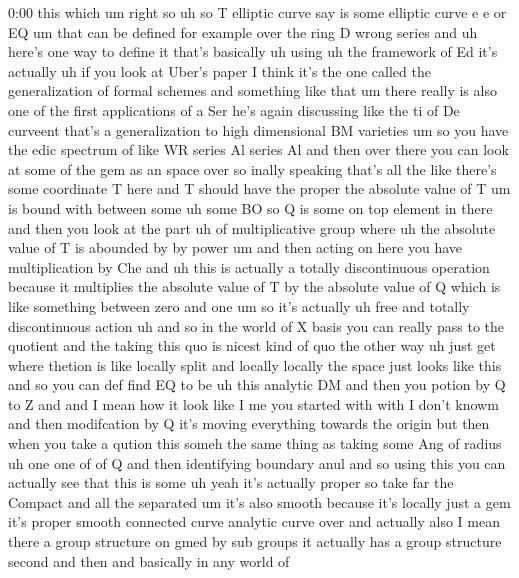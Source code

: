 \begin{unfinished}{0:00}
this
which
um  right  so
uh  so  T  elliptic  curve  say  is  some
elliptic  curve
e  e  or  EQ  um  that  can  be  defined  for
example  over  the  ring  D  wrong
series  and  uh  here's  one  way  to  define
it
that's  basically  uh  using  uh  the
framework  of
Ed  it's  actually  uh  if  you  look  at
Uber's  paper  I  think  it's  the  one  called
the  generalization  of  formal  schemes  and
something  like  that  um  there  really  is
also  one  of  the  first  applications  of  a
Ser  he's  again  discussing  like  the  ti  of
De  curveent  that's  a  generalization  to
high  dimensional  BM
varieties  um
so  you  have  the  edic  spectrum  of  like  WR
series
Al  series
Al  and
then  over  there  you  can  look  at  some  of
the  gem  as  an  space
over  so  inally  speaking  that's  all
the  like  there's  some  coordinate  T  here
and  T  should  have  the  proper  the
absolute  value  of  T
um  is  bound  with  between
some  uh  some
BO  so  Q  is  some  on  top  element  in  there
and  then  you  look  at  the  part  uh  of
multiplicative  group  where  uh  the
absolute  value  of  T  is  abounded
by  by  power  um  and  then  acting  on  here
you  have  multiplication  by
Che
and  uh  this  is  actually  a  totally
discontinuous  operation  because  it
multiplies  the  absolute  value  of  T  by
the  absolute  value  of  Q  which  is  like
something  between  zero  and  one  um  so
it's  actually  uh  free  and  totally
discontinuous  action  uh  and  so  in  the
world  of  X  basis  you  can  really  pass  to
the  quotient  and  the  taking  this  quo  is
nicest  kind  of  quo  the  other  way  uh  just
get  where  thetion  is  like  locally  split
and  locally  locally  the  space  just  looks
like
this  and  so  you  can  def  find  EQ  to
be  uh  this  analytic  DM  and  then  you
potion
by  Q  to
Z  and
and  I  mean  how  it  look  like  I  me  you
started  with  with  I  don't
knowm  and  then  modifcation  by  Q  it's
moving  everything  towards  the  origin  but
then  when  you  take  a  qution  this  someh
the  same  thing  as  taking  some  Ang  of
radius  uh  one  one  of  of  Q  and  then
identifying  boundary
anul  and  so  using  this  you  can  actually
see  that  this  is
some  uh  yeah  it's  actually  proper  so
take  far  the  Compact  and  all  the
separated  um  it's  also  smooth  because
it's  locally  just  a
gem  it's  proper  smooth  connected  curve
analytic  curve
over  and  actually  also  I  mean  there  a
group  structure  on
gmed  by  sub  groups  it  actually  has  a
group  structure
second
and  then  and  basically  in  any  world  of

\end{unfinished}

